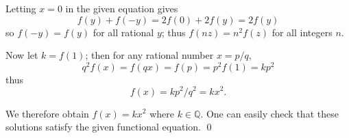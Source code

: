 \documentclass[a4paper, 12pt]{article}
\begin{document}
\begin{enumerate}
    Letting $x = 0$ in the given equation gives
    \begin{equation*}
        f(y) + f(-y) = 2f(0) + 2f(y) = 2f(y)
    \end{equation*}
    so $f(-y) = f(y)$ for all rational $y$; thus $f(nz) = n^2 f(z)$ for all integers $n$.
    
    Now let $k = f(1)$; then for any rational number $x = p/q$,
    \begin{equation*}
        q^2 f(x) = f(qx) = f(p) = p^2 f(1) = kp^2
    \end{equation*}
    thus
    \begin{equation*}
        f(x) = kp^2/q^2 = kx^2 .
    \end{equation*}
    
    We therefore obtain $f(x) = kx^2$ where $k \in \mathbb{Q}$. One can easily check that these solutions satisfy the given functional equation.    \qed

    

\end{enumerate}
\end{document}
